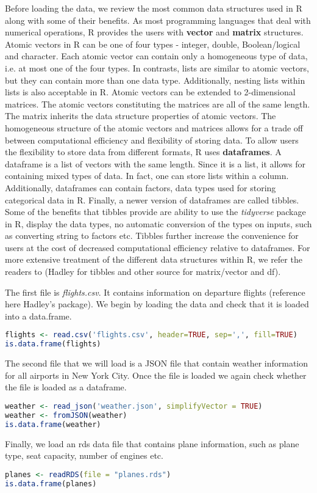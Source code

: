 Before loading the data, we review the most common data structures used in R along with some of their benefits. As most programming languages that deal with numerical operations, R provides the users with \textbf{vector} and \textbf{matrix} structures. Atomic vectors in R can be one of four types - integer, double, Boolean/logical and character. Each atomic vector can contain only a homogeneous type of data, i.e. at most one of the four types. In contrasts, lists are similar to atomic vectors, but they can contain more than one data type. Additionally, nesting lists within lists is also acceptable in R. Atomic vectors can be extended to 2-dimensional matrices. The atomic vectors constituting the matrices are all of the same length. The matrix inherits the data structure properties of atomic vectors. The homogeneous structure of the atomic vectors and matrices allows for a trade off between computational efficiency and flexibility of storing data. To allow users the flexibility to store data from different formats, R uses \textbf{dataframes}. A dataframe is a list of vectors with the same length. Since it is a list, it allows for containing mixed types of data. In fact, one can store lists within a column. Additionally, dataframes can contain factors, data types used for storing categorical data in R. Finally, a newer version of dataframes are called tibbles. Some of the benefits that tibbles provide are ability to use the \textit{tidyverse} package in R, display the data types, no automatic conversion of the types on inputs, such as converting string to factors etc. Tibbles further increase the convenience for users at the cost of decreased computational efficiency relative to dataframes. For more extensive treatment of the different data structures within R, we refer the readers to (Hadley for tibbles and other source for matrix/vector and df).

The first file is \textit{flights.csv}. It contains information on departure flights (reference here Hadley's package). We begin by loading the data and check that it is loaded into a data.frame.
\begin{lstlisting}[language=R]
flights <- read.csv('flights.csv', header=TRUE, sep=',', fill=TRUE)
is.data.frame(flights)
\end{lstlisting}
The second file that we will load is a JSON file that contain weather information for all airports in New York City. Once the file is loaded we again check whether the file is loaded as a dataframe.
\begin{lstlisting}[language=R]
weather <- read_json('weather.json', simplifyVector = TRUE)
weather <- fromJSON(weather)
is.data.frame(weather)
\end{lstlisting}
Finally, we load an rds data file that contains plane information, such as plane type, seat capacity, number of engines etc.
\begin{lstlisting}[language=R]
planes <- readRDS(file = "planes.rds")
is.data.frame(planes)
\end{lstlisting}

